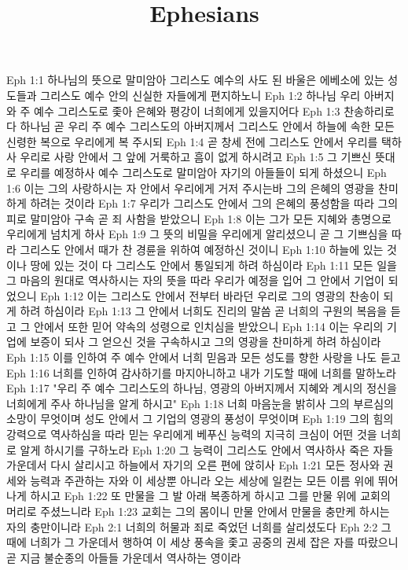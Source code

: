 

\title{Ephesians}

Eph 1:1  하나님의 뜻으로 말미암아 그리스도 예수의 사도 된 바울은 에베소에 있는 성도들과 그리스도 예수 안의 신실한 자들에게 편지하노니
Eph 1:2  하나님 우리 아버지와 주 예수 그리스도로 좇아 은혜와 평강이 너희에게 있을지어다
Eph 1:3  찬송하리로다 하나님 곧 우리 주 예수 그리스도의 아버지께서 그리스도 안에서 하늘에 속한 모든 신령한 복으로 우리에게 복 주시되
Eph 1:4  곧 창세 전에 그리스도 안에서 우리를 택하사 우리로 사랑 안에서 그 앞에 거룩하고 흠이 없게 하시려고
Eph 1:5  그 기쁘신 뜻대로 우리를 예정하사 예수 그리스도로 말미암아 자기의 아들들이 되게 하셨으니
Eph 1:6  이는 그의 사랑하시는 자 안에서 우리에게 거저 주시는바 그의 은혜의 영광을 찬미하게 하려는 것이라
Eph 1:7  우리가 그리스도 안에서 그의 은혜의 풍성함을 따라 그의 피로 말미암아 구속 곧 죄 사함을 받았으니
Eph 1:8  이는 그가 모든 지혜와 총명으로 우리에게 넘치게 하사
Eph 1:9  그 뜻의 비밀을 우리에게 알리셨으니 곧 그 기쁘심을 따라 그리스도 안에서 때가 찬 경륜을 위하여 예정하신 것이니
Eph 1:10  하늘에 있는 것이나 땅에 있는 것이 다 그리스도 안에서 통일되게 하려 하심이라
Eph 1:11  모든 일을 그 마음의 원대로 역사하시는 자의 뜻을 따라 우리가 예정을 입어 그 안에서 기업이 되었으니
Eph 1:12  이는 그리스도 안에서 전부터 바라던 우리로 그의 영광의 찬송이 되게 하려 하심이라
Eph 1:13  그 안에서 너희도 진리의 말씀 곧 너희의 구원의 복음을 듣고 그 안에서 또한 믿어 약속의 성령으로 인치심을 받았으니
Eph 1:14  이는 우리의 기업에 보증이 되사 그 얻으신 것을 구속하시고 그의 영광을 찬미하게 하려 하심이라
Eph 1:15  이를 인하여 주 예수 안에서 너희 믿음과 모든 성도를 향한 사랑을 나도 듣고
Eph 1:16  너희를 인하여 감사하기를 마지아니하고 내가 기도할 때에 너희를 말하노라
Eph 1:17  "우리 주 예수 그리스도의 하나님, 영광의 아버지께서 지혜와 계시의 정신을 너희에게 주사 하나님을 알게 하시고"
Eph 1:18  너희 마음눈을 밝히사 그의 부르심의 소망이 무엇이며 성도 안에서 그 기업의 영광의 풍성이 무엇이며
Eph 1:19  그의 힘의 강력으로 역사하심을 따라 믿는 우리에게 베푸신 능력의 지극히 크심이 어떤 것을 너희로 알게 하시기를 구하노라
Eph 1:20  그 능력이 그리스도 안에서 역사하사 죽은 자들 가운데서 다시 살리시고 하늘에서 자기의 오른 편에 앉히사
Eph 1:21  모든 정사와 권세와 능력과 주관하는 자와 이 세상뿐 아니라 오는 세상에 일컫는 모든 이름 위에 뛰어나게 하시고
Eph 1:22  또 만물을 그 발 아래 복종하게 하시고 그를 만물 위에 교회의 머리로 주셨느니라
Eph 1:23  교회는 그의 몸이니 만물 안에서 만물을 충만케 하시는 자의 충만이니라
Eph 2:1  너희의 허물과 죄로 죽었던 너희를 살리셨도다
Eph 2:2  그 때에 너희가 그 가운데서 행하여 이 세상 풍속을 좇고 공중의 권세 잡은 자를 따랐으니 곧 지금 불순종의 아들들 가운데서 역사하는 영이라

